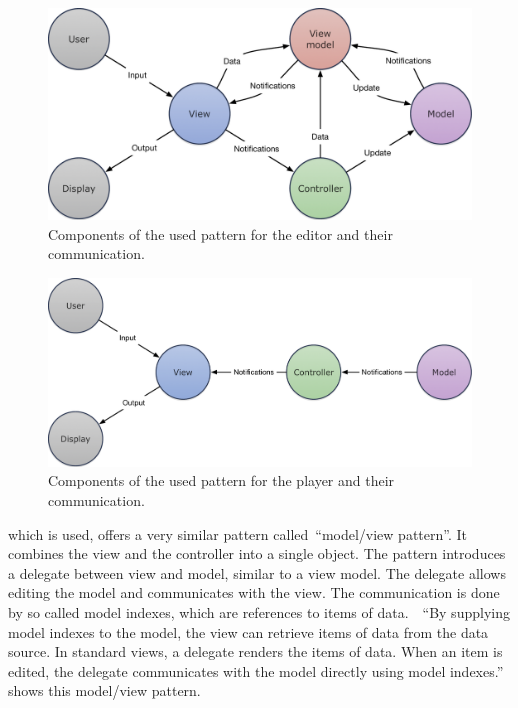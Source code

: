 \documentclass[%
    a4paper,    %
    justified,  %
    nobib,      %
    openany     %
]{tufte-book}
\makeatletter
\renewcommand{\label}[1]{\@tufte@label{##1}}%
\makeatother
\begin{document}
\begin{figure}[ht]
  \includegraphics[width=0.8\linewidth]{images/mvvmc}
  \caption{Components of the used pattern for the editor and their
    communication.}
  \label{fig:software-design-pattern-components-editor}
\end{figure}

\begin{figure}[ht]
  \includegraphics[width=0.8\linewidth]{images/mvvmc-player}
  \caption{Components of the used pattern for the player and their
    communication.}
  \label{fig:software-design-pattern-components-player}
\end{figure}

 which is used, offers a very similar pattern
called~\enquote{model/view pattern}. It combines the view and the controller
into a single object. The pattern introduces a delegate between view and model,
similar to a view model. The delegate allows editing the model and communicates
with the view. The communication is done by so called model indexes, which are
references to items of data.~\cite{qt-mvp-2017}~\enquote{By supplying model
indexes to the model, the view can retrieve items of data from the data source.
In standard views, a delegate renders the items of data. When an item is edited,
the delegate communicates with the model directly using model
indexes.}~\cite{qt-mvp-2017}  shows
this model/view pattern.
\end{document}
